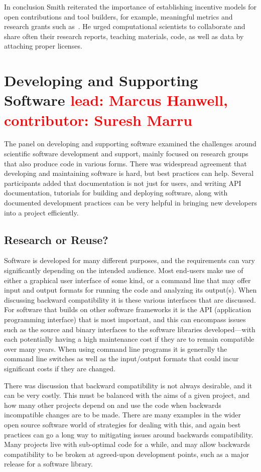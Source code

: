 \documentclass[11pt, oneside]{amsart}
\newcommand{\note}[1]{ {\textcolor{red}    { #1 }}}
\begin{document}
In conclusion Smith reiterated the importance of establishing
incentive models for open contributions and tool builders, for
example, meaningful metrics and research grants such as~\cite{NSF_software_vision}. He urged computational scientists to
collaborate and share often their research reports, teaching
materials, code, as well as data by attaching proper licenses.

\section{Developing and Supporting Software \note{\scriptsize lead: Marcus Hanwell, contributor: Suresh Marru}} \label{sec:devel}

The panel on developing and supporting software examined the challenges
around scientific software development and support, mainly focused on research
groups that also produce code in various forms. There was widespread agreement
that developing and maintaining software is hard, but best practices can help.
Several participants added that documentation is not just for users, and writing
API documentation, tutorials for building and deploying software, along with
documented development practices can be very helpful in bringing  new developers
into a project efficiently.

\subsection{Research or Reuse?}

Software is developed for many different purposes, and the requirements can
vary significantly depending on the intended audience. Most end-users make use
of either a graphical user interface of some kind, or a command line that may
offer input and output formats for running the code and analyzing its output(s).
When discussing backward compatibility it is these various interfaces that are
discussed. For software that builds on other software frameworks it is the
API (application programming interface) that is most important, and this can
encompass issues such as the source and binary interfaces to the software
libraries developed---with each potentially having a high maintenance cost if
they are to remain compatible over many years. When using command line programs
it is generally the command line switches as well as the input/output formats
that could incur significant costs if they are changed.

There was discussion that backward compatibility is not always desirable, and it
can be very costly. This must be balanced with the aims of a given project, and how
many other projects depend on and use the code when backwards incompatible
changes are to be made. There are many examples in the wider open source
software world of strategies for dealing with this, and again best practices
can go a long way to mitigating issues around backwards compatibility. Many
projects live with sub-optimal code for a while, and may allow backwards
compatibility to be broken at agreed-upon development points, such as a major
release for a software library.
\end{document}
